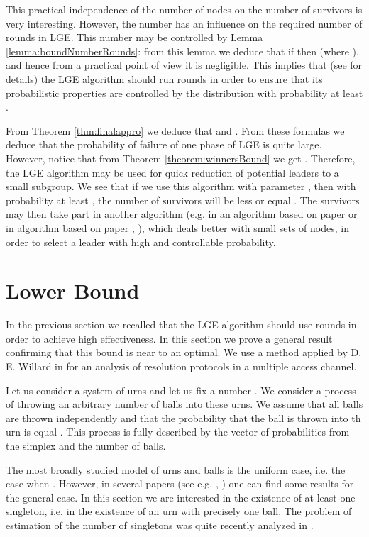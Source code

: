 \documentclass[proceedings]{dmtcs}
\begin{document}
This  practical independence of the number  of nodes on the number of survivors is very interesting. 
However, the number  has an influence on the required number of rounds in LGE.
This number may be controlled by Lemma 
\ref{lemma:boundNumberRounds}:  from this lemma we deduce that if 
 then  (where ), 
and hence from a practical point of view it is negligible.
This implies that (see \cite{DBLP:conf/mascots/JacquetMM13} for details) the LGE algorithm should run
 rounds in order 
to ensure that its probabilistic properties are controlled by the distribution  with probability at least
.



From Theorem \ref{thm:finalappro} we  deduce that 
and .
From these formulas we deduce that the probability of failure of one phase of LGE is quite large. However, notice
that from Theorem \ref{theorem:winnersBound} we get 
.
Therefore, the LGE algorithm may be used for quick reduction of potential leaders to a small subgroup. 
We see that if we use this algorithm with parameter , then with
probability at least , the number of survivors will be less or equal  .
The survivors may then take part in another algorithm (e.g. in an algorithm based on paper 
\cite{DBLP:journals/dm/Prodinger93} 
or in algorithm based on paper \cite{DBLP:journals/combinatorics/JansonS97}, \cite{GLandHP2009}), 
which deals better with small sets of nodes,  in order to select a leader with high and controllable 
probability.

\section{Lower Bound}
\label{sec:lowerbound}

In the previous section we recalled that the LGE algorithm should use  rounds in order to achieve high
effectiveness. In this section we prove a general result confirming that this bound is near to an optimal.
We use a method applied by D. E. Willard in \cite{Willard:1986} for an analysis of resolution protocols
in a multiple access channel.

Let us consider  a system  of  urns and let us fix a number .
We consider a process of throwing an arbitrary number  of balls into 
these urns. We assume that all balls are thrown independently and that the probability that
the ball is thrown into th urn is equal .
This process is fully described by the vector  of probabilities from the simplex
 and the number  of balls.

The most broadly studied model of urns and balls is the uniform case, i.e. the case when 
. However, in several papers 
(see e.g. \cite{Flajolet:1992}, \cite{boneh1997coupon}) one can find some results for the general case.
In this section we are interested in the existence of at least one singleton, i.e. in the existence of an urn 
with precisely one ball. The problem of estimation of the number of singletons was quite recently analyzed in 
\cite{EJP699}.
\end{document}
